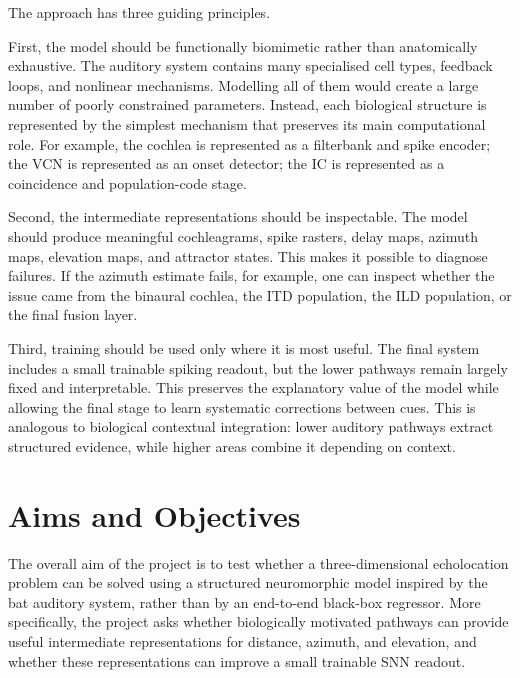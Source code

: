The approach has three guiding principles.

First, the model should be functionally biomimetic rather than anatomically exhaustive. The auditory system contains many specialised cell types, feedback loops, and nonlinear mechanisms. Modelling all of them would create a large number of poorly constrained parameters. Instead, each biological structure is represented by the simplest mechanism that preserves its main computational role. For example, the cochlea is represented as a filterbank and spike encoder; the VCN is represented as an onset detector; the IC is represented as a coincidence and population-code stage.

Second, the intermediate representations should be inspectable. The model should produce meaningful cochleagrams, spike rasters, delay maps, azimuth maps, elevation maps, and attractor states. This makes it possible to diagnose failures. If the azimuth estimate fails, for example, one can inspect whether the issue came from the binaural cochlea, the ITD population, the ILD population, or the final fusion layer.

Third, training should be used only where it is most useful. The final system includes a small trainable spiking readout, but the lower pathways remain largely fixed and interpretable. This preserves the explanatory value of the model while allowing the final stage to learn systematic corrections between cues. This is analogous to biological contextual integration: lower auditory pathways extract structured evidence, while higher areas combine it depending on context.

\section{Aims and Objectives}

The overall aim of the project is to test whether a three-dimensional echolocation problem can be solved using a structured neuromorphic model inspired by the bat auditory system, rather than by an end-to-end black-box regressor. More specifically, the project asks whether biologically motivated pathways can provide useful intermediate representations for distance, azimuth, and elevation, and whether these representations can improve a small trainable SNN readout.

